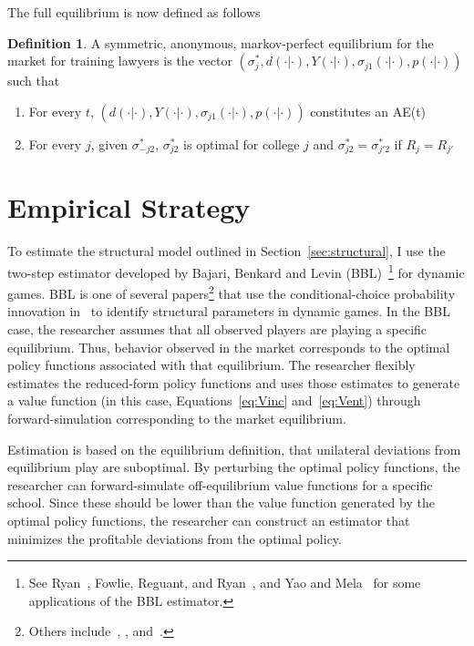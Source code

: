 \documentclass[12pt]{article}
\theoremstyle{definition}
\newtheorem{definition}{Definition}[section]
\begin{document}
The full equilibrium is now defined as follows
\begin{definition}
  A symmetric, anonymous, markov-perfect equilibrium for the market for training lawyers is the vector $(\sigma^*_j, d(\cdot|\cdot), Y(\cdot|\cdot), \sigma_{j1}(\cdot|\cdot), p(\cdot|\cdot))$ such that
  \begin{enumerate}
    \item For every $t$, $(d(\cdot|\cdot), Y(\cdot|\cdot), \sigma_{j1}(\cdot|\cdot), p(\cdot|\cdot))$ constitutes an AE(t)
    \item For every $j$, given $\sigma^*_{-j2}$, $\sigma^*_{j2}$ is optimal for college $j$ and $\sigma^*_{j2} = \sigma^*_{j'2}$ if $R_j = R_{j'}$
  \end{enumerate}
\end{definition}

\section{Empirical Strategy}
\label{sec:structural_empiricalstrat}

To estimate the structural model outlined in Section~\ref{sec:structural}, I use the two-step estimator developed by Bajari, Benkard and Levin (BBL)~\cite{BBL}\footnote{See Ryan~\cite{Ryan}, Fowlie, Reguant, and Ryan~\cite{FowlieReguantRyan}, and Yao and Mela~\cite{YaoMela} for some applications of the BBL estimator.} for dynamic games. BBL is one of several papers\footnote{Others include~\cite{AgMira}, \cite{PakesOstBerry}, and~\cite{PesSchmidtDeng}.} that use the conditional-choice probability innovation in~\cite{HotzMiller} to identify structural parameters in dynamic games. In the BBL case, the researcher assumes that all observed players are playing a specific equilibrium. Thus, behavior observed in the market corresponds to the optimal policy functions associated with that equilibrium. The researcher flexibly estimates the reduced-form policy functions and uses those estimates to generate a value function (in this case, Equations~\eqref{eq:Vinc} and~\eqref{eq:Vent}) through forward-simulation corresponding to the market equilibrium.

Estimation is based on the equilibrium definition, that unilateral deviations from equilibrium play are suboptimal. By perturbing the optimal policy functions, the researcher can forward-simulate off-equilibrium value functions for a specific school. Since these should be lower than the value function generated by the optimal policy functions, the researcher can construct an estimator that minimizes the profitable deviations from the optimal policy.
\end{document}
